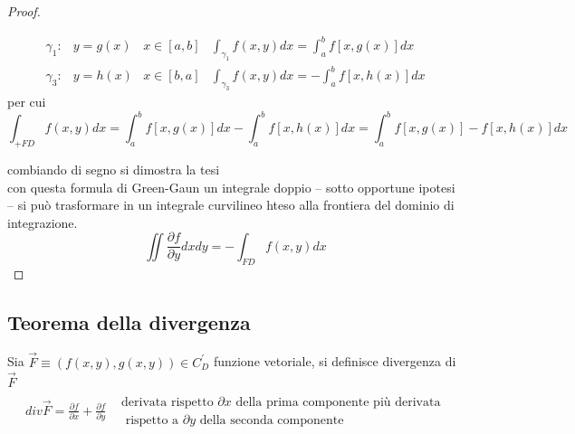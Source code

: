 \begin{proof}
\begin{description}
			\clearpage
			\begin{equation*}
				\begin{matrix}
					\gamma_1: &y=g(x)&x\in[a,b]&\int_{\gamma_1}f(x,y) dx= 
					\int_{a}^{b}f[x,g(x)]dx\\
					\gamma_3: &y=h(x)& x\in[b, a] & \int_{\gamma_3}f(x,y)dx=-\int_{a}^{b}f[x,h(x)]dx
				\end{matrix}
			\end{equation*}
			per cui
			\begin{equation*}
				\int_{+FD}
				f(x,y)dx=\int_{a}^{b}f[x,g(x)]dx-\int_{a}^{b}f[x,h(x)]dx =
				\int_{a}^{b}f[x,g(x)]-f[x,h(x)]dx
			\end{equation*}
	\end{description}
	combiando di segno si dimostra la tesi\\
	con questa formula di {\color{red}Green-Gaun} un integrale doppio -- sotto
	opportune ipotesi -- si può trasformare in un integrale curvilineo hteso
	alla frontiera del dominio di integrazione.
	\begin{equation*}
		\iint \frac{\partial f}{\partial y}dxdy=-\int_{FD} f(x,y) dx
	\end{equation*}
\end{proof}
\subsection{Teorema della divergenza}
\begin{defi}
	Sia $\vec{F}\equiv (f(x,y),g(x,y))\in C^\prime_D$ funzione vetoriale, si
	definisce {\color{red}divergenza} di $\vec{F}$
	\begin{equation*}
		\begin{matrix}
			div \vec{F}=\frac{\partial f}{\partial x}+\frac{\partial
			f}{\partial y} & \begin{matrix}
				\text{derivata rispetto } \partial x \text{ della prima
				componente più derivata}\\
				\text{ rispetto a } \partial y \text{ della
				seconda componente}
			\end{matrix}
		\end{matrix}
	\end{equation*}
\end{defi}
